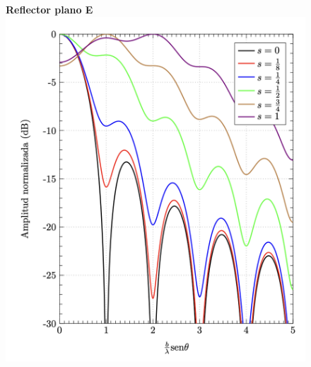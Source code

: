 \documentclass[twocolumn, 8pt]{extarticle}
\begin{document}
\begin{multicols}{2}
    \begin{figure}[H]
        \centering
        \textbf{Reflector plano E}
        \includegraphics[width=\columnwidth]{reflector_plano_e.png}
    \end{figure}


\end{multicols}
\end{document}
